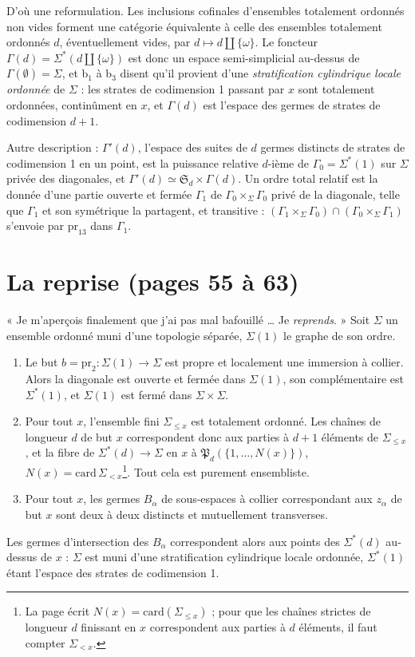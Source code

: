\documentclass[11pt,a4paper]{article}
\begin{document}
D'où une reformulation. Les inclusions cofinales d'ensembles totalement ordonnés
non vides forment une catégorie équivalente à celle des ensembles totalement
ordonnés $d$, éventuellement vides, par $d \mapsto d \amalg \{\omega\}$. Le foncteur
$\Gamma(d) = \Sigma^{*}(d \amalg \{\omega\})$ est donc un espace semi-simplicial
au-dessus de $\Gamma(\emptyset) = \Sigma$, et b$_1$ à b$_3$ disent qu'il provient
d'une \emph{stratification cylindrique locale ordonnée} de $\Sigma$ : les strates de
codimension 1 passant par $x$ sont totalement ordonnées, continûment en $x$, et
$\Gamma(d)$ est l'espace des germes de strates de codimension $d+1$.

Autre description : $\Gamma'(d)$, l'espace des suites de $d$ germes distincts de
strates de codimension 1 en un point, est la puissance relative $d$-ième de $\Gamma_0
= \Sigma^{*}(1)$ sur $\Sigma$ privée des diagonales, et $\Gamma'(d) \simeq
\mathfrak{S}_d \times \Gamma(d)$. Un ordre total relatif est la donnée d'une partie
ouverte et fermée $\Gamma_1$ de $\Gamma_0 \times_\Sigma \Gamma_0$ privé de la
diagonale, telle que $\Gamma_1$ et son symétrique la partagent, et transitive :
$(\Gamma_1 \times_\Sigma \Gamma_0) \cap (\Gamma_0 \times_\Sigma \Gamma_1)$ s'envoie
par $\mathrm{pr}_{13}$ dans $\Gamma_1$.

\section*{La reprise (pages 55 à 63)}

« Je m'aperçois finalement que j'ai pas mal bafouillé … Je
\emph{reprends}. » Soit $\Sigma$ un ensemble ordonné muni d'une topologie séparée,
$\Sigma(1)$ le graphe de son ordre.
\begin{enumerate}
\item[(a)] Le but $b = \mathrm{pr}_2 : \Sigma(1) \to \Sigma$ est propre et
localement une immersion à collier. Alors la diagonale est ouverte et fermée
dans $\Sigma(1)$, son complémentaire est $\Sigma^{*}(1)$, et $\Sigma(1)$ est fermé
dans $\Sigma \times \Sigma$.
\item[(b)] Pour tout $x$, l'ensemble fini $\Sigma_{\leq x}$ est totalement ordonné.
Les chaînes de longueur $d$ de but $x$ correspondent donc aux parties à $d+1$
éléments de $\Sigma_{\leq x}$, et la fibre de $\Sigma^{*}(d) \to \Sigma$ en $x$ à
$\mathfrak{P}_d(\{1, …, N(x)\})$, $N(x) = \mathrm{card}\, \Sigma_{<x}$\footnote{La
page écrit $N(x) = \mathrm{card}(\Sigma_{\leq x})$ ; pour que les chaînes strictes
de longueur $d$ finissant en $x$ correspondent aux parties à $d$ éléments, il faut
compter $\Sigma_{<x}$.}. Tout cela est purement ensembliste.
\item[(c)] Pour tout $x$, les germes $B_\alpha$ de sous-espaces à collier
correspondant aux $z_\alpha$ de but $x$ sont deux à deux distincts et mutuellement
transverses.
\end{enumerate}
Les germes d'intersection des $B_\alpha$ correspondent alors aux points des
$\Sigma^{*}(d)$ au-dessus de $x$ : $\Sigma$ est muni d'une stratification
cylindrique locale ordonnée, $\Sigma^{*}(1)$ étant l'espace des strates de
codimension 1.
\end{document}
